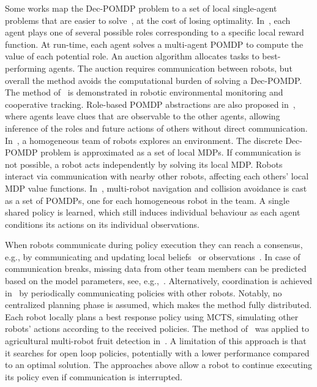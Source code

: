 \documentclass[journal]{IEEEtran}
\begin{document}
Some works map the Dec-POMDP problem to a set of local single-agent problems that are easier to solve~\cite{capitan2013decentralized,zhang2017role,matignon2012coordinated,long2018towards}{, at the cost of losing optimality}.
In~\cite{capitan2013decentralized}, each agent plays one of {several} possible roles corresponding to a specific
local reward function.
At run-time, each agent solves a multi-agent POMDP to compute the value of each potential role.
An auction algorithm {allocates} tasks to best-performing agents.
The auction requires communication between robots, but overall the method avoids the computational burden of solving a Dec-POMDP.
The method of~\cite{capitan2013decentralized} is demonstrated in robotic environmental monitoring and cooperative tracking.
Role-based POMDP abstractions are also proposed in~\cite{zhang2017role}, where agents leave clues that are observable to the other agents, allowing inference of the roles and future actions of others without direct communication.
In~\cite{matignon2012coordinated}, a homogeneous team of robots explores an environment. The discrete Dec-POMDP problem is approximated as a set of local MDPs.
If communication is not possible, a robot acts independently by solving its local MDP.
Robots interact via communication with nearby other robots, affecting each others' local MDP value functions.
In~\cite{long2018towards}, multi-robot navigation and collision avoidance is cast as a set of POMDPs, one for each homogeneous robot in the team. A single shared policy is learned, which still induces individual behaviour as each agent conditions its actions on its individual observations.

When robots communicate during policy execution they can reach a consensus, e.g., by communicating and updating local beliefs~\cite{zhang2013active,capitan2013decentralized} or observations~\cite{ragi2014decentralized,goldhoorn2018searching}.
In case of communication breaks, missing data from other team members can be predicted based on the model parameters, see, e.g.,~\cite{matignon2012coordinated,capitan2013decentralized}.
Alternatively, coordination is achieved in~\cite{best2019dec} by periodically communicating policies with other robots.
Notably, no centralized planning phase is assumed, {which makes} the method fully distributed.
Each robot locally plans a best response policy using MCTS, simulating other robots' actions according to the received policies.
The method of~\cite{best2019dec} was applied to agricultural multi-robot fruit detection in~\cite{sukkar2019multi}.
{A limitation of this approach is that it searches for open loop policies, potentially with a lower performance compared to an optimal solution.}
The approaches above allow a robot to continue executing its policy even if communication is interrupted.
\end{document}
